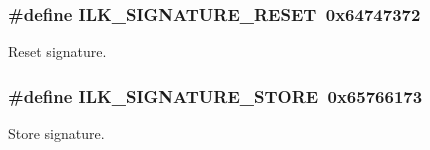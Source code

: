 \subsubsection[{\texorpdfstring{I\+L\+K\+\_\+\+S\+I\+G\+N\+A\+T\+U\+R\+E\+\_\+\+R\+E\+S\+ET}{ILK_SIGNATURE_RESET}}]{\setlength{\rightskip}{0pt plus 5cm}\#define I\+L\+K\+\_\+\+S\+I\+G\+N\+A\+T\+U\+R\+E\+\_\+\+R\+E\+S\+ET~0x64747372}\hypertarget{group__IL__CONST__SIGNATURES_gafec6f03943f9194696a21de117dedbfc}{}\label{group__IL__CONST__SIGNATURES_gafec6f03943f9194696a21de117dedbfc}


Reset signature. 

\subsubsection[{\texorpdfstring{I\+L\+K\+\_\+\+S\+I\+G\+N\+A\+T\+U\+R\+E\+\_\+\+S\+T\+O\+RE}{ILK_SIGNATURE_STORE}}]{\setlength{\rightskip}{0pt plus 5cm}\#define I\+L\+K\+\_\+\+S\+I\+G\+N\+A\+T\+U\+R\+E\+\_\+\+S\+T\+O\+RE~0x65766173}\hypertarget{group__IL__CONST__SIGNATURES_ga4c86aee7016ece956e15b5d1523fbc07}{}\label{group__IL__CONST__SIGNATURES_ga4c86aee7016ece956e15b5d1523fbc07}


Store signature. 

